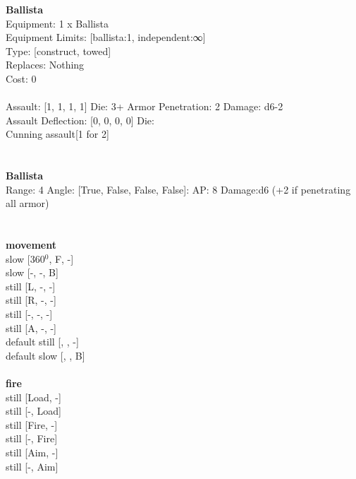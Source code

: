 \noindent 

{\bf Ballista } \\
Equipment: 1 x Ballista \\
Equipment Limits: [ballista:1, independent:∞] \\
Type: [construct, towed] \\
Replaces: Nothing \\
Cost: 0\\
\ \\
Assault: [1, 1, 1, 1] Die: 3+ Armor Penetration: 2 Damage: d6-2 \\
Assault Deflection: [0, 0, 0, 0] Die: \\
\indent Cunning assault[1 for 2]\\ 
 
\ \\

\ \\
{\bf Ballista } \\



Range: 4  Angle: [True, False, False, False]: AP: 8 Damage:d6 (+2 if penetrating all armor) \\




 
\ \\



\ \\ {\bf movement } \\
slow [360$^0$, F, -] \\
slow [-, -, B] \\
still [L, -, -] \\
still [R, -, -] \\
still [-, -, -] \\
still [A, -, -] \\
default still [, , -] \\
default slow [, , B] \\
\ \\ {\bf fire } \\
still [Load, -] \\
still [-, Load] \\
still [Fire, -] \\
still [-, Fire] \\
still [Aim, -] \\
still [-, Aim] \\


